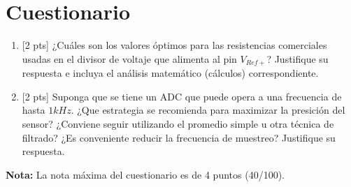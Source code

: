 %
%



\section{Cuestionario}%
\label{sec:questionnaire}

\begin{enumerate}
	\item{} [2 pts] ¿Cuáles son los valores óptimos para las resistencias comerciales usadas en el divisor de voltaje que alimenta al pin $V_{Ref+}$?
	Justifique su respuesta e incluya el análisis matemático (cálculos) correspondiente.

	\item{} [2 pts] Suponga que se tiene un ADC que puede opera a una frecuencia de hasta $1kHz$.
	¿Que estrategia se recomienda para maximizar la presición del sensor? ¿Conviene seguir utilizando el promedio simple u otra técnica de filtrado? ¿Es conveniente reducir la frecuencia de muestreo? Justifique su respuesta.
\end{enumerate}

\noindent\textbf{Nota:} La nota máxima del cuestionario es de 4 puntos (40/100).
